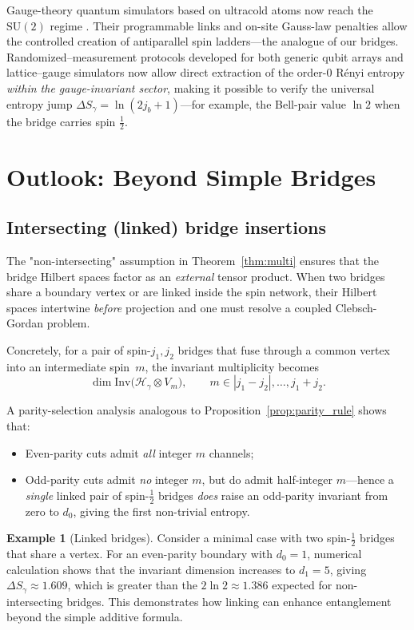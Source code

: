 \documentclass[11pt, a4paper]{article}
\theoremstyle{plain}
\theoremstyle{definition}
\newtheorem{example}{Example}
\theoremstyle{remark}
\newcommand{\Hil}{\mathcal{H}}
\newcommand{\Inv}{\mathrm{Inv}}
\newcommand{\SU}{\mathrm{SU}}
\begin{document}
Gauge-theory quantum simulators based on ultracold atoms now reach the $\SU(2)$ regime \cite{Zohar2022GaugeSim}. Their programmable links and on-site Gauss-law penalties allow the controlled creation of antiparallel spin ladders—the analogue of our bridges.
Randomized–measurement protocols developed for both generic qubit arrays and lattice–gauge simulators
\cite{Brydges2019,Bringewatt2024,Leone2022} now allow direct extraction of the order-0 R\'enyi entropy \emph{within the
gauge-invariant sector}, making it possible to verify the universal entropy
jump $\Delta S_{\gamma}=\ln(2j_b+1)$—for example, the Bell-pair value $\ln 2$ when the bridge carries spin $\tfrac12$.

\section{Outlook: Beyond Simple Bridges}
\label{sec:outlook}

\subsection{Intersecting (linked) bridge insertions}
\label{sec:intersecting}

The "non-intersecting" assumption in Theorem~\ref{thm:multi} ensures that the bridge Hilbert spaces factor as an \emph{external} tensor product. When two bridges share a boundary vertex or are linked inside the spin network, their Hilbert spaces intertwine \emph{before} projection and one must resolve a coupled Clebsch-Gordan problem.

Concretely, for a pair of spin-$j_{1},j_{2}$ bridges that fuse through a common vertex into an intermediate spin~$m$, the invariant multiplicity becomes
\[  \dim \Inv\!\bigl(\Hil_{\gamma}\otimes V_{m}\bigr),  \qquad  m\in |j_{1}-j_{2}|,\dots,j_{1}+j_{2}.\]

A parity-selection analysis analogous to Proposition~\ref{prop:parity_rule} shows that:
\begin{itemize}\setlength\itemsep{4pt}
  \item Even-parity cuts admit \emph{all} integer $m$ channels;
  \item Odd-parity cuts admit \emph{no} integer $m$, but do admit half-integer $m$—hence a \emph{single} linked pair of spin-$\frac{1}{2}$ bridges \emph{does} raise an odd-parity invariant from zero to $d_{0}$, giving the first non-trivial entropy.
\end{itemize}

\begin{example}[Linked bridges]
  Consider a minimal case with two spin-$\frac{1}{2}$ bridges that share a vertex. For an even-parity boundary with $d_0=1$, numerical calculation shows that the invariant dimension increases to $d_1=5$, giving $\Delta S_{\gamma} \approx 1.609$, which is greater than the $2\ln 2 \approx 1.386$ expected for non-intersecting bridges. This demonstrates how linking can enhance entanglement beyond the simple additive formula.
\end{example}
\end{document}

